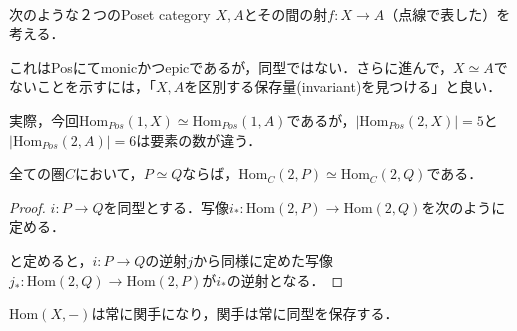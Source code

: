 \documentclass[uplatex, 12pt, dvipdfmx]{jsarticle}
\begin{document}
\begin{example}\label{example-generalized-elements}　

    次のような２つのPoset category $X,A$とその間の射$f:X\to A$（点線で表した）を考える．
    \begin{center}
    \end{center}
    これはPosにてmonicかつepicであるが，同型ではない．さらに進んで，$X\simeq A$でないことを示すには，「$X,A$を区別する保存量(invariant)を見つける」と良い．

    実際，今回$\mathrm{Hom}_{Pos}(1,X)\simeq\mathrm{Hom}_{Pos}(1,A)$であるが，$|\mathrm{Hom}_{Pos}(2,X)|=5$と$|\mathrm{Hom}_{Pos}(2,A)|=6$は要素の数が違う．
    \vspace{1cm}

    \begin{proposition*}
        全ての圏$C$において，$P\simeq Q$ならば，$\mathrm{Hom}_C(2,P)\simeq\mathrm{Hom}_C(2,Q)$である．
    \end{proposition*}
    \begin{proof}
        $i:P\to Q$を同型とする．写像$i_*:\mathrm{Hom}(2,P)\to\mathrm{Hom}(2,Q)$を次のように定める．
        \begin{center}
        \end{center}
        と定めると，$i:P\to Q$の逆射$j$から同様に定めた写像$j_*:\mathrm{Hom}(2,Q)\to\mathrm{Hom}(2,P)$が$i_*$の逆射となる．
    \end{proof}
    \vspace{3cm}
    \begin{remark*}
        $\mathrm{Hom}(X,-)$は常に関手になり，関手は常に同型を保存する．
    \end{remark*}
    \vspace{1cm}
\end{example}
\end{document}

